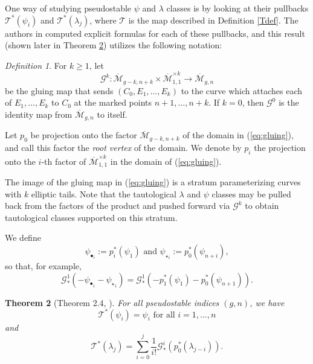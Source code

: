 \documentclass[leqno,12pt]{amsart}
\newtheorem{theorem}{Theorem}[section]
\theoremstyle{remark}
\newtheorem{definition}[theorem]{Definition}
\numberwithin{equation}{section}
\begin{document}
One way of studying pseudostable $\psi$ and $\lambda$ classes is by looking at their pullbacks $\mathcal{T}^*(\psi_i)$ and $\mathcal{T}^*(\lambda_j)$, where $\mathcal{T}$ is the map described in Definition \ref{Tdef}. The authors in \cite{PSHI} computed explicit formulas for each of these pullbacks, and this result (shown later in Theorem \ref{Pullback}) utilizes the following notation:

\begin{definition}\label{def:gluing}
    For $k \geq 1$, let
    \begin{equation}\label{eq:gluing}
        \mathcal{G}^k: \overline{\mathcal{M}}_{g-k, n+k} \times \overline{\mathcal{M}}^{\times k}_{1, 1} \rightarrow \overline{\mathcal{M}}_{g, n}
    \end{equation}
be the gluing map that sends $(C_0, E_1, \dots, E_k)$ to the curve which attaches each of $E_1, \dots, E_k$ to $C_0$ at the marked points $n+1, \dots, n+k$. If $k=0$, then $\mathcal{G}^0$ is the identity map from $\overline{\mathcal{M}}_{g, n}$ to itself.

Let $p_0$ be projection onto the factor $\overline{\mathcal{M}}_{g-k, n+k}$ of the domain in (\ref{eq:gluing}), and call this factor the \emph{root vertex} of the domain. We denote by $p_i$ the projection onto the $i$-th factor of $\overline{\mathcal{M}}^{\times k}_{1, 1}$ in the domain of (\ref{eq:gluing}).
\end{definition}


The image of the gluing map in (\ref{eq:gluing}) is a stratum parameterizing curves with $k$ elliptic tails. Note that the tautological $\lambda$ and $\psi$ classes may be pulled back from the factors of the product and pushed forward via $\mathcal{G}^k$ to obtain tautological classes supported on this stratum. 

We define 
\begin{equation}\label{eq:starbullet}
    \psi_{\bullet_i} := p_i^\ast(\psi_1) \text{ and } \psi_{\star_i} := p_0^\ast(\psi_{n+i}),
\end{equation}
so that, for example,
$$
\mathcal{G}^1_\ast(-\psi_{\bullet_1} - \psi_{\star_1}) = \mathcal{G}^1_\ast(-p_1^\ast(\psi_1) - p_0^\ast(\psi_{n+1})).
$$

\begin{theorem} [Theorem 2.4, \cite{PSHI}] \label{Pullback} For all pseudostable indices $(g, n)$, we have 
$$
\mathcal{T}^*(\psi_i) = \psi_i \text{ for all } i = 1, \dots, n
$$ 
and 
$$
\mathcal{T}^*(\lambda_j) = \sum_{i=0}^j \frac{1}{i!}\mathcal{G}_*^i(p_0^*(\lambda_{j-i})).
$$
\end{theorem}
\end{document}
